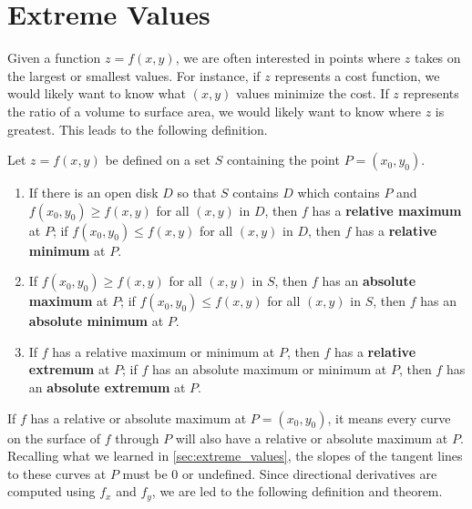 \section{Extreme Values}\label{sec:multi_extreme_values}

Given a function $z=f(x,y)$, we are often interested in points where $z$ takes on the largest or smallest values. For instance, if $z$ represents a cost function, we would likely want to know what $(x,y)$ values minimize the cost. If $z$ represents the ratio of a volume to surface area, we would likely want to know where $z$ is greatest. This leads to the following definition.

\begin{definition}\label{def:multi_extrema}
Let $z=f(x,y)$ be defined on a set $S$ containing the point $P=(x_0,y_0)$.
\begin{enumerate}
	\item If there is an open disk $D$ so that $S$ contains $D$ which contains $P$ and $f(x_0,y_0) \geq f(x,y)$ for all $(x,y)$ in $D$, then $f$ has a \textbf{relative maximum} at $P$; if $f(x_0,y_0) \leq f(x,y)$ for all $(x,y)$ in $D$, then $f$ has a \textbf{relative minimum} at $P$.
	
	\item	If $f(x_0,y_0)\geq f(x,y)$ for all $(x,y)$ in $S$, then $f$ has an \textbf{absolute maximum} at $P$; if $f(x_0,y_0)\leq f(x,y)$ for all $(x,y)$ in $S$, then $f$ has an \textbf{absolute minimum} at $P$.
	
	\item		If $f$ has a relative maximum or minimum at $P$, then $f$ has a \textbf{relative extremum} at $P$; if $f$ has an absolute maximum or minimum at $P$, then $f$ has an \textbf{absolute extremum} at $P$.
\end{enumerate}
\end{definition}

If $f$ has a relative or absolute maximum at $P=(x_0,y_0)$, it means every curve on the surface of $f$ through $P$ will also have a relative or absolute maximum at $P$. Recalling what we learned in \autoref{sec:extreme_values}, the slopes of the tangent lines to these curves at $P$ must be 0 or undefined. Since directional derivatives are computed using $f_x$ and $f_y$, we are led to the following definition and theorem.

